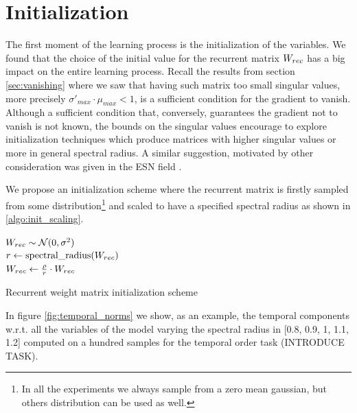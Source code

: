 \section{Initialization}
The first moment of the learning process is the initialization of the variables. We found that the choice of the initial value for the recurrent matrix $W_{rec}$ has a big impact on the entire learning process. Recall the results from section  \ref{sec:vanishing} where we saw that having such matrix too small singular values, more precisely $\sigma'_{max} \cdot \mu_{max} <1 $, is a sufficient condition for the gradient to vanish. Although a sufficient condition that, conversely, guarantees the gradient not to vanish is not known, the bounds on the singular values encourage to explore initialization techniques which produce matrices with higher singular values or more in general spectral radius. A similar suggestion, motivated by other consideration was given in the ESN field \cite{reservoirSummary}.

We propose an initialization scheme where the recurrent matrix is firstly sampled from some distribution\footnote{In all the experiments we always sample from a zero mean gaussian, but others distribution can be used as well.} and scaled to have a specified spectral radius as shown in \ref{algo:init_scaling}.

\begin{algorithm}[!h]
	\BlankLine

	$W_{rec} \sim \mathcal{N}(0, \sigma^2)$\\
	$r \gets \mbox{spectral\_radius}(W_{rec})$\\
	$W_{rec}\gets \frac{\rho}{r} \cdot W_{rec}$\\
	\caption{Recurrent weight matrix initialization scheme}
	\label{algo:init_scaling}
\end{algorithm}

 In figure \ref{fig:temporal_norms} we show, as an example, the temporal components w.r.t. all the variables of the model varying the spectral radius in [0.8, 0.9, 1, 1.1, 1.2] computed on a hundred samples for the temporal order task (INTRODUCE TASK).

